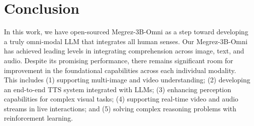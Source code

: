 \section{Conclusion}

In this work, we have open-sourced Megrez-3B-Omni as a step toward developing a truly omni-modal LLM that integrates all human senses. Our Megrez-3B-Omni has achieved leading levels in integrating comprehension across image, text, and audio. 
Despite its promising performance, there remains significant room for improvement in the foundational capabilities across each individual modality. This includes (1) supporting multi-image and video understanding; (2) developing an end-to-end TTS system integrated with LLMs; (3) enhancing perception capabilities for complex visual tasks; (4) supporting real-time video and audio streams in live interactions; and (5) solving complex reasoning problems with reinforcement learning.